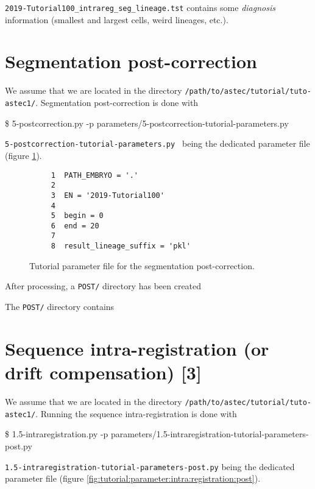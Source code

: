 \texttt{2019-Tutorial100\_intrareg\_seg\_lineage.tst} contains some
\textit{diagnosis} information (smallest and largest cells, weird
lineages, etc.). 



\section{Segmentation post-correction}

We assume that we are located in the directory
\texttt{/path/to/astec/tutorial/tuto-astec1/}. Segmentation post-correction is
done with
\begin{code}{0.8}
  \$ 5-postcorrection.py -p parameters/5-postcorrection-tutorial-parameters.py 
\end{code}
\texttt{5-postcorrection-tutorial-parameters.py } being the
dedicated parameter file  (figure
\ref{fig:tutorial:parameter:post:correction}).


\begin{figure}
\begin{framed}
\begin{verbatim}
     1	PATH_EMBRYO = '.'
     2	
     3	EN = '2019-Tutorial100'
     4	
     5	begin = 0
     6	end = 20
     7					
     8	result_lineage_suffix = 'pkl'		
\end{verbatim}
\end{framed}
\caption{\label{fig:tutorial:parameter:post:correction} Tutorial
  parameter file for the segmentation post-correction.}
\end{figure}

After processing, a \texttt{POST/} directory has been created

\mbox{}
\mbox{}

The \texttt{POST/} directory contains

\mbox{}
\mbox{}



\section{Sequence intra-registration (or drift compensation) [3]}
\label{sec:tutorial:intra:registration:post}
 
We assume that we are located in the directory
\texttt{/path/to/astec/tutorial/tuto-astec1/}. Running the sequence intra-registration is
done with
\begin{code}{0.8}
  \$ 1.5-intraregistration.py -p parameters/1.5-intraregistration-tutorial-parameters-post.py 
\end{code}
\texttt{1.5-intraregistration-tutorial-parameters-post.py} being the
dedicated parameter file  (figure \ref{fig:tutorial:parameter:intra:registration:post}).


